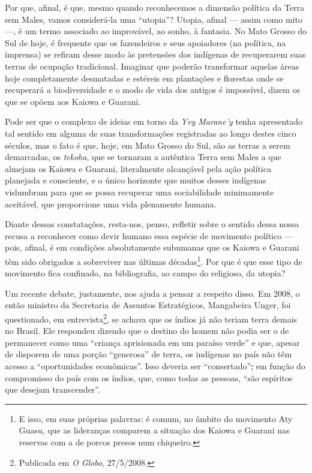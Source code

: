 Por que, afinal, é que, mesmo quando reconhecemos a dimensão política da
Terra sem Males, vamos considerá-la uma ``utopia''? Utopia, afinal ---
assim como mito ---, é um termo associado ao improvável, ao sonho, à
fantasia. No Mato Grosso do Sul de hoje, é frequente que os fazendeiros
e seus apoiadores (na política, na imprensa) se refiram desse modo às
pretensões dos indígenas de recuperarem suas terras de ocupação
tradicional. Imaginar que poderão transformar aquelas áreas hoje
completamente desmatadas e estéreis em plantações e florestas onde se
recuperará a biodiversidade e o modo de vida dos antigos é impossível,
dizem os que se opõem aos Kaiowa e Guarani.

Pode ser que o complexo de ideias em torno da \emph{Yvy Marane'y} tenha
apresentado tal sentido em alguma de suas transformações registradas ao
longo destes cinco séculos, mas o fato é que, hoje, em Mato Grosso do
Sul, são as terras a serem demarcadas, os \emph{tekoha}, que se tornaram
a autêntica Terra sem Males a que almejam os Kaiowa e Guarani,
literalmente alcançável pela ação política planejada e consciente, e o
único horizonte que muitos desses indígenas vislumbram para que se possa
recuperar uma sociabilidade minimamente aceitável, que proporcione uma
vida plenamente humana.

Diante dessas constatações, resta-nos, penso, refletir sobre o sentido
dessa nossa recusa a reconhecer como devir humano essa espécie de
movimento político --- pois, afinal, é em condições absolutamente
subumanas que os Kaiowa e Guarani têm sido obrigados a sobreviver nas
últimas décadas\footnote{E isso, em suas próprias palavras: é comum, no
  âmbito do movimento Aty Guasu, que as lideranças comparem a situação
  dos Kaiowa e Guarani nas reservas com a de porcos presos num
  chiqueiro.}. Por que é que esse tipo de movimento fica confinado, na
bibliografia, ao campo do religioso, da utopia?

Um recente debate, justamente, nos ajuda a pensar a respeito disso. Em
2008, o então ministro da Secretaria de Assuntos Estratégicos,
Mangabeira Unger, foi questionado, em entrevista\footnote{Publicada em
  \emph{O Globo}, 27/5/2008.}, se achava que os índios já não teriam
terra demais no Brasil. Ele respondeu dizendo que o destino do homem não
podia ser o de permanecer como uma ``criança aprisionada em um paraíso
verde'' e que, apesar de disporem de uma porção ``generosa'' de terra,
os indígenas no país não têm acesso a ``oportunidades econômicas''. Isso
deveria ser ``consertado''\sout{,} em função do compromisso do país com
os índios, que, como todas as pessoas, ``são espíritos que desejam
transcender''.


